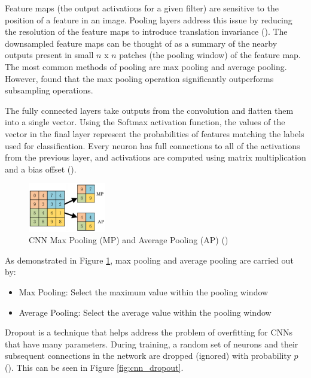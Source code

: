 Feature maps (the output activations for a given filter) are sensitive to the position of a feature in an image. Pooling layers address this issue by reducing the resolution of the feature maps to introduce translation invariance (\cite{scherer_evaluation_2010}). The downsampled feature maps can be thought of as a summary of the nearby outputs present in small $n$ x $n$ patches (the pooling window) of the feature map. The most common methods of pooling are max pooling and average pooling. However, \cite{scherer_evaluation_2010} found that the max pooling operation significantly outperforms subsampling operations.

The fully connected layers take outputs from the convolution and flatten them into a single vector. Using the Softmax activation function, the values of the vector in the final layer represent the probabilities of features matching the labels used for classification. Every neuron has full connections to all of the activations from the previous layer, and activations are computed using matrix multiplication and a bias offset (\cite{stanford_cs231n_2019}).

\begin{figure}[ht!]
\centering
\includegraphics[width=0.30\textwidth]{media/literature/machine_learning/ml_pooling.png}
\caption[CNN max pooling and average pooling ]{\acrshort{CNN} Max Pooling (MP) and Average Pooling (AP) (\cite{wang_pooling_2018})}
\label{fig:cnn_pooling}
\end{figure}

As demonstrated in Figure \ref{fig:cnn_pooling}, max pooling and average pooling are carried out by:

\begin{itemize}
    \item Max Pooling: Select the maximum value within the pooling window
    \item Average Pooling: Select the average value within the pooling window
\end{itemize}

Dropout is a technique that helps address the problem of overfitting for \acrshort{CNN}s that have many parameters. During training, a random set of neurons and their subsequent connections in the network are dropped (ignored) with probability $p$ (\cite{srivastava_dropout_2014}). This can be seen in Figure \ref{fig:cnn_dropout}.

